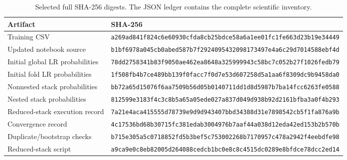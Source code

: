 \begin{table}[t]
\small\centering
\caption{Selected full SHA-256 digests. The JSON ledger contains the complete scientific inventory.}
\begin{tabularx}{\textwidth}{P{4cm}X}
\toprule
Artifact & SHA-256 \\
\midrule
Training CSV & \texttt{a269ad841f824c6e60930cfda8cb25bd}\allowbreak\texttt{ce58a6a1ee01fc1fe663d23b19e34449} \\
Updated notebook source & \texttt{b1bf6978a045cb0abed587b7f2924095}\allowbreak\texttt{432098173497e4a6c29d7014588ebf4d} \\
Initial global LR probabilities & \texttt{78dd2758341b83f9050ae462ea8648a3}\allowbreak\texttt{25999943c58bc7c052b27f1026fedb79} \\
Initial fold LR probabilities & \texttt{1f508fb4b7ce489bb139f0facc7f0d7e}\allowbreak\texttt{53d607258d5a1aa6f8309dc9b9458da0} \\
Nonnested stack probabilities & \texttt{bb72a65d15076f6aa7509b56d05b0140}\allowbreak\texttt{711dd1d8d5987b7ba14fcc6263fe0588} \\
Nested stack probabilities & \texttt{812599e3183f4c3c8b5a65a05ede027a}\allowbreak\texttt{837d049d938b92d2161bfba3a0f4b293} \\
Reduced-stack execution record & \texttt{7a21e4aca415555d78739e9d9d943407}\allowbreak\texttt{bbd34388d31e7898542cb5f1fa876a9b} \\
Convergence record & \texttt{4c17536bd68b30715fc381edab300497}\allowbreak\texttt{6b7aaf44a038d12eda42ed153b2b570b} \\
Duplicate/bootstrap checks & \texttt{b715e305a5c0718852fd5b3bef5c7530}\allowbreak\texttt{02268b7170957c478a2942f4eebdfe98} \\
Reduced-stack script & \texttt{a9ca9e0c8eb82005d264088cedcb1bc0}\allowbreak\texttt{e8c8c4515dc0289e8bfdce78dcc2ed14} \\
\bottomrule
\end{tabularx}
\end{table}
